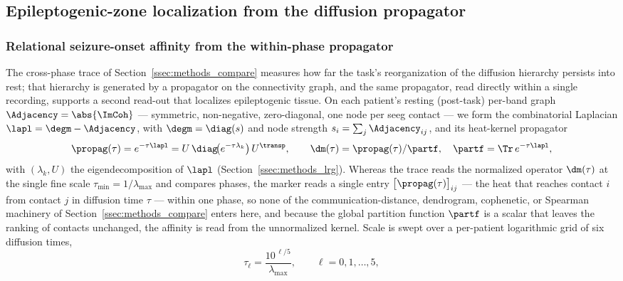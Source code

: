 \subsection{Epileptogenic-zone localization from the diffusion propagator}
\label{ssec:methods_epi}

\subsubsection{Relational seizure-onset affinity from the within-phase propagator}
\label{sssec:methods_epi_affinity}
The cross-phase trace of Section~\ref{ssec:methods_compare} measures how far the task's reorganization of the diffusion hierarchy persists into rest; that hierarchy is generated by a propagator on the connectivity graph, and the same propagator, read directly within a single recording, supports a second read-out that localizes epileptogenic tissue. On each patient's resting (post-task) per-band graph \(\Adjacency = \abs{\ImCoh}\) --- symmetric, non-negative, zero-diagonal, one node per \gls{seeg} contact --- we form the combinatorial Laplacian \(\lapl = \degm - \Adjacency\), with \(\degm = \diag(s)\) and node strength \(s_i = \sum_{j}\Adjacency_{ij}\), and its heat-kernel propagator
\begin{equation}
    \propag(\tau) = e^{-\tau\lapl} = U\,\diag\!\big(e^{-\tau\lambda_{k}}\big)\,U^{\transp}, \qquad \dm(\tau) = \propag(\tau)/\partf, \quad \partf = \Tr\,e^{-\tau\lapl},
    \label{eq:methods_epi_kernel}
\end{equation}
with \((\lambda_{k},U)\) the eigendecomposition of \(\lapl\) (Section~\ref{ssec:methods_lrg}). Whereas the trace reads the normalized operator \(\dm(\tau)\) at the single fine scale \(\tau_{\min}=1/\lambda_{\max}\) and compares phases, the marker reads a single entry \(\big[\propag(\tau)\big]_{ij}\) --- the heat that reaches contact \(i\) from contact \(j\) in diffusion time \(\tau\) --- within one phase, so none of the communication-distance, dendrogram, cophenetic, or Spearman machinery of Section~\ref{ssec:methods_compare} enters here, and because the global partition function \(\partf\) is a scalar that leaves the ranking of contacts unchanged, the affinity is read from the unnormalized kernel. Scale is swept over a per-patient logarithmic grid of six diffusion times,
\begin{equation}
    \tau_{\ell} = \frac{10^{\,\ell/5}}{\lambda_{\max}}, \qquad \ell = 0,1,\dots,5,
    \label{eq:methods_epi_tau}
\end{equation}
